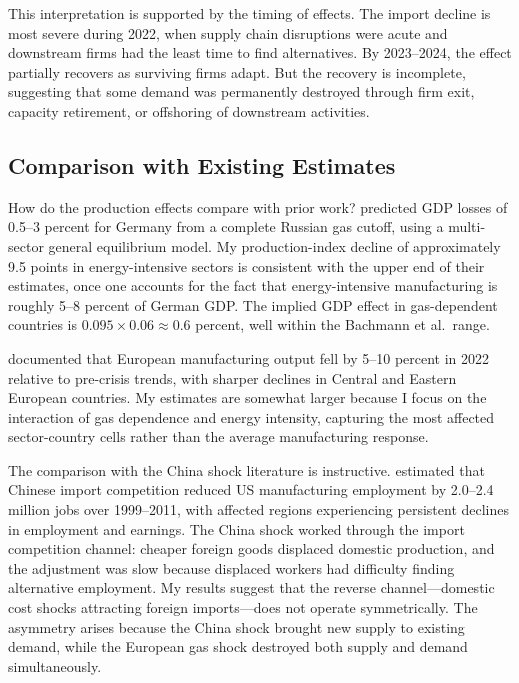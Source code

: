 \documentclass[12pt]{article}
\begin{document}
This interpretation is supported by the timing of effects. The import decline is most severe during 2022, when supply chain disruptions were acute and downstream firms had the least time to find alternatives. By 2023--2024, the effect partially recovers as surviving firms adapt. But the recovery is incomplete, suggesting that some demand was permanently destroyed through firm exit, capacity retirement, or offshoring of downstream activities.

\subsection{Comparison with Existing Estimates}

How do the production effects compare with prior work? \citet{bachmann2022} predicted GDP losses of 0.5--3 percent for Germany from a complete Russian gas cutoff, using a multi-sector general equilibrium model. My production-index decline of approximately 9.5 points in energy-intensive sectors is consistent with the upper end of their estimates, once one accounts for the fact that energy-intensive manufacturing is roughly 5--8 percent of German GDP. The implied GDP effect in gas-dependent countries is $0.095 \times 0.06 \approx 0.6$ percent, well within the Bachmann et al.\ range.

\citet{borin2023} documented that European manufacturing output fell by 5--10 percent in 2022 relative to pre-crisis trends, with sharper declines in Central and Eastern European countries. My estimates are somewhat larger because I focus on the interaction of gas dependence and energy intensity, capturing the most affected sector-country cells rather than the average manufacturing response.

The comparison with the China shock literature is instructive. \citet{autor2013china} estimated that Chinese import competition reduced US manufacturing employment by 2.0--2.4 million jobs over 1999--2011, with affected regions experiencing persistent declines in employment and earnings. The China shock worked through the import competition channel: cheaper foreign goods displaced domestic production, and the adjustment was slow because displaced workers had difficulty finding alternative employment. My results suggest that the reverse channel---domestic cost shocks attracting foreign imports---does not operate symmetrically. The asymmetry arises because the China shock brought new supply to existing demand, while the European gas shock destroyed both supply and demand simultaneously.
\end{document}
